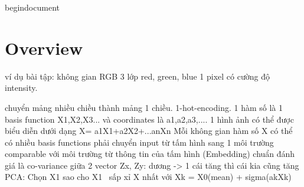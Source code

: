 begin{document}

\maketitle

\section{Overview}
\textrm{ví dụ bài tập: không gian RGB 3 lớp red, green, blue 1 pixel có cường độ intensity. }

\newline
\textrm{chuyển mảng nhiều chiều thành mảng 1 chiều. 1-hot-encoding. 1 hàm số là 1 basis function X1,X2,X3... và coordinates là a1,a2,a3,.... 1 hình ảnh có thể được biểu diễn dưới dạng X= a1X1+a2X2+...anXn}
\textrm{Mỗi không gian hàm số X có thể có nhiều basis functions}
\textrm{phải chuyển input từ tấm hình sang 1 môi trường comparable với môi trường từ thông tin của tấm hình (Embedding)}
\textrm{chuẩn đánh giá là co-variance giữa 2 vector Zx, Zy: dương -> 1 cái tăng thì cái kia cũng tăng }
\textrm{PCA: Chọn X1 sao cho X1~ sấp xỉ X nhất với Xk = X0(mean) + sigma(akXk)}



